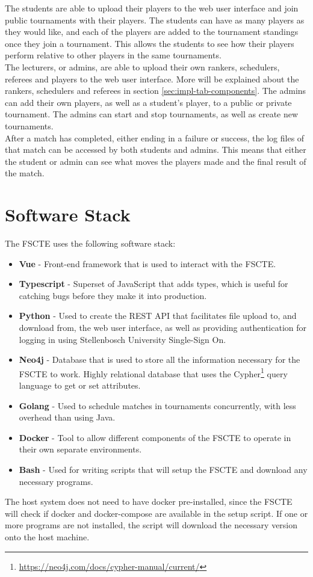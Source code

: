 \documentclass[a4paper, 11pt]{report}
\begin{document}
The students are able to upload their players to the web user interface and join
public tournaments with their players. The students can have as many players as
they would like, and each of the players are added to the tournament standings
once they join a tournament. This allows the students to see how their players
perform relative to other players in the same tournaments. \\

The lecturers, or admins, are able to upload their own rankers, schedulers,
referees and players to the web user interface. More will be explained about the
rankers, schedulers and referees in section \ref{sec:impl-tab-components}. The
admins can add their own players, as well as a student's player, to a public or
private tournament. The admins can start and stop tournaments, as well as create
new tournaments. \\

After a match has completed, either ending in a failure or success, the log files
of that match can be accessed by both students and admins. This means that
either the student or admin can see what moves the players made and the
final result of the match.

\section{Software Stack}

The FSCTE uses the following software stack:
\begin{itemize}
	\item \textbf{Vue} - Front-end framework that is used to interact with the
	FSCTE.
	\item \textbf{Typescript} - Superset of JavaScript that adds types, which
	is useful for catching bugs before they make it into production.
	\item \textbf{Python} - Used to create the REST API that facilitates
	file upload to, and download from, the web user interface, as well as providing
	authentication for logging in using Stellenbosch University Single-Sign On.
	\item \textbf{Neo4j} - Database that is used to store all the information
	necessary for the FSCTE to work. Highly relational database that uses the
	Cypher\footnote{\url{https://neo4j.com/docs/cypher-manual/current/}} query
	language to get or set attributes.
	\item \textbf{Golang} - Used to schedule matches in tournaments concurrently,
	with less overhead than using Java.
	\item \textbf{Docker} - Tool to allow different components of the FSCTE to
	operate in their own separate environments.
	\item \textbf{Bash} - Used for writing scripts that will setup the FSCTE and
	download any necessary programs.
\end{itemize}
The host system does not need to have docker pre-installed, since the FSCTE will
check if docker and docker-compose are available in the setup script. If one or
more programs are not installed, the script will download the necessary version
onto the host machine.
\end{document}
